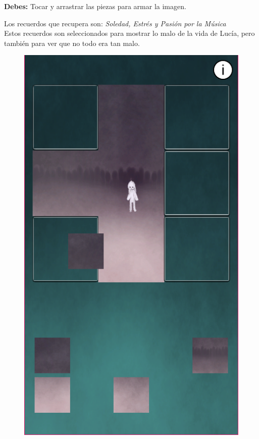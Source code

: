 \textbf{Debes:} Tocar y arrastrar las piezas para armar la imagen.

Los recuerdos que recupera son: \textit{Soledad, Estrés y Pasión por la Música}\\
Estos recuerdos son seleccionados para mostrar lo malo de la vida de Lucía, pero también para ver que no todo era tan malo.

\begin{figure}[h]
	\centering
	\begin{minipage}{0.45\textwidth}
   		\includegraphics[scale=.5]{imgs/screenshot07.png}
	\end{minipage}
	\begin{minipage}{0.45\textwidth}
		\begin{flushright}

\end{flushright}
\end{minipage}
\end{figure}
